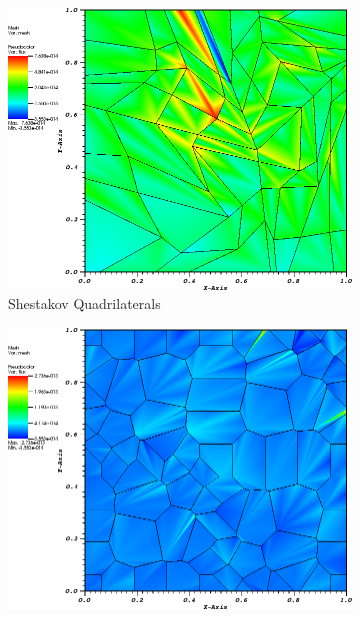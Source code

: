 \begin{figure}
{\begin{subfigure}[b]{0.465\textwidth}
	\end{subfigure}
}
\vspace{3mm}
{
	\begin{subfigure}[b]{0.465\textwidth}
		\centering
		\label{subfig::shes_quad_me_k2_lin_sol}
		\includegraphics[width=\textwidth]{figures/sec_BF/quad_err_shesquad_ME2.png}
		\caption{Shestakov Quadrilaterals}
	\end{subfigure}
	\hfill
	\begin{subfigure}[b]{0.465\textwidth}
		\centering
		\label{subfig::smooth_poly_me_k2_lin_sol}
		\includegraphics[width=\textwidth]{figures/sec_BF/quad_err_sinepoly_ME2.png}

\end{subfigure}}
\end{figure}
